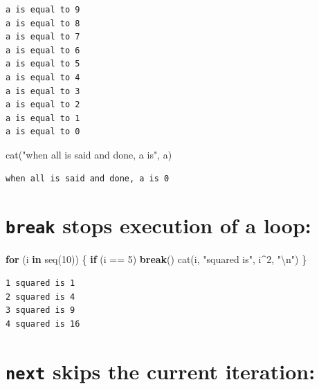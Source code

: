 \documentclass[
]{book}
\newenvironment{Shaded}{\begin{snugshade}}{\end{snugshade}}
\newcommand{\ControlFlowTok}[1]{\textcolor[rgb]{0.13,0.29,0.53}{\textbf{#1}}}
\newcommand{\DecValTok}[1]{\textcolor[rgb]{0.00,0.00,0.81}{#1}}
\newcommand{\FunctionTok}[1]{\textcolor[rgb]{0.00,0.00,0.00}{#1}}
\newcommand{\NormalTok}[1]{#1}
\newcommand{\SpecialCharTok}[1]{\textcolor[rgb]{0.00,0.00,0.00}{#1}}
\newcommand{\StringTok}[1]{\textcolor[rgb]{0.31,0.60,0.02}{#1}}
\begin{document}
\begin{verbatim}
a is equal to 9 
a is equal to 8 
a is equal to 7 
a is equal to 6 
a is equal to 5 
a is equal to 4 
a is equal to 3 
a is equal to 2 
a is equal to 1 
a is equal to 0 
\end{verbatim}

\begin{Shaded}
\begin{Highlighting}[]
\FunctionTok{cat}\NormalTok{(}\StringTok{"when all is said and done, a is"}\NormalTok{, a)}
\end{Highlighting}
\end{Shaded}

\begin{verbatim}
when all is said and done, a is 0
\end{verbatim}

\hypertarget{break-stops-execution-of-a-loop}{%
\section{\texorpdfstring{\texttt{break} stops execution of a loop:}{break stops execution of a loop:}}\label{break-stops-execution-of-a-loop}}

\begin{Shaded}
\begin{Highlighting}[]
\ControlFlowTok{for}\NormalTok{ (i }\ControlFlowTok{in} \FunctionTok{seq}\NormalTok{(}\DecValTok{10}\NormalTok{)) \{}
  \ControlFlowTok{if}\NormalTok{ (i }\SpecialCharTok{==} \DecValTok{5}\NormalTok{) }\ControlFlowTok{break}\NormalTok{()}
  \FunctionTok{cat}\NormalTok{(i, }\StringTok{"squared is"}\NormalTok{, i}\SpecialCharTok{\^{}}\DecValTok{2}\NormalTok{, }\StringTok{"}\SpecialCharTok{\textbackslash{}n}\StringTok{"}\NormalTok{)}
\NormalTok{\}}
\end{Highlighting}
\end{Shaded}

\begin{verbatim}
1 squared is 1 
2 squared is 4 
3 squared is 9 
4 squared is 16 
\end{verbatim}

\hypertarget{next-skips-the-current-iteration}{%
\section{\texorpdfstring{\texttt{next} skips the current iteration:}{next skips the current iteration:}}\label{next-skips-the-current-iteration}}
\end{document}
